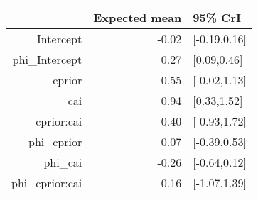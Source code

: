 \begin{tabular}{rrl}
  \hline
 & Expected mean & 95\% CrI \\ 
  \hline
Intercept & -0.02 & [-0.19,0.16] \\ 
  phi\_Intercept & 0.27 & [0.09,0.46] \\ 
  cprior & 0.55 & [-0.02,1.13] \\ 
  cai & 0.94 & [0.33,1.52] \\ 
  cprior:cai & 0.40 & [-0.93,1.72] \\ 
  phi\_cprior & 0.07 & [-0.39,0.53] \\ 
  phi\_cai & -0.26 & [-0.64,0.12] \\ 
  phi\_cprior:cai & 0.16 & [-1.07,1.39] \\ 
   \hline
\end{tabular}

